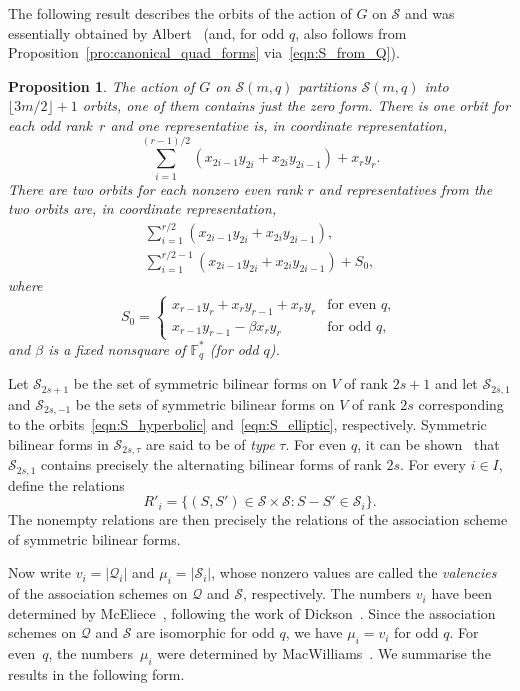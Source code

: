 \documentclass[10pt]{article}
\newtheorem{prop}[theorem]{Proposition}
\theoremstyle{definition}
\newcommand{\FF}{\mathbb{F}}
\newcommand{\Q}{\mathscr{Q}}
\renewcommand{\S}{\mathscr{S}}
\renewcommand{\t}{\tau}
\newcommand{\abs}[1]{\lvert#1\rvert}
\newcommand{\floor}[1]{\lfloor#1\rfloor}
\begin{document}
\par
The following result describes the orbits of the action of $G$ on $\S$ and was essentially obtained by Albert~\cite{Alb1938} (and, for odd $q$, also follows from Proposition~\ref{pro:canonical_quad_forms} via~\eqref{eqn:S_from_Q}).
\begin{prop}
\label{pro:canonical_sym_bil_forms}
The action of $G$ on $\S(m,q)$ partitions $\S(m,q)$ into $\floor{3m/2}+1$ orbits, one of them contains just the zero form. There is one orbit for each odd rank~$r$ and one representative is, in coordinate representation, 
\[
\sum_{i=1}^{(r-1)/2}(x_{2i-1}y_{2i}+x_{2i}y_{2i-1})+x_ry_r.
\]
There are two orbits for each nonzero even rank $r$ and representatives from the two orbits are, in coordinate representation,
\begin{gather}
\sum_{i=1}^{r/2}(x_{2i-1}y_{2i}+x_{2i}y_{2i-1}),   \label{eqn:S_hyperbolic}\\
\sum_{i=1}^{r/2-1}(x_{2i-1}y_{2i}+x_{2i}y_{2i-1})+S_0,   \label{eqn:S_elliptic}
\end{gather}
where 
\[
S_0=\begin{cases}
x_{r-1}y_r+x_ry_{r-1}+x_ry_r & \text{for even $q$},\\
x_{r-1}y_{r-1}-\beta x_ry_r       & \text{for odd $q$},
\end{cases}
\]
and $\beta$ is a fixed nonsquare of $\FF_q^*$ (for odd $q$).
\end{prop}
\par
Let $\S_{2s+1}$ be the set of symmetric bilinear forms on $V$ of rank $2s+1$ and let $\S_{2s,1}$ and $\S_{2s,-1}$ be the sets of symmetric bilinear forms on $V$ of rank $2s$ corresponding to the orbits~\eqref{eqn:S_hyperbolic} and~\eqref{eqn:S_elliptic}, respectively. Symmetric bilinear forms in $\S_{2s,\t}$ are said to be of \emph{type} $\t$. For even $q$, it can be shown~\cite{Alb1938} that $\S_{2s,1}$ contains precisely the alternating bilinear forms of rank $2s$. For every $i\in I$, define the relations 
\begin{equation}
R'_i=\{(S,S')\in\S\times \S:S-S'\in \S_i\}.   \label{eqn:relations_S}
\end{equation}
The nonempty relations are then precisely the relations of the association scheme of symmetric bilinear forms. 
\par
Now write $v_i=\abs{\Q_i}$ and $\mu_i=\abs{\S_i}$, whose nonzero values are called the \emph{valencies} of the association schemes on $\Q$ and $\S$, respectively. The numbers $v_i$ have been determined by McEliece~\cite{McE1969}, following the work of Dickson~\cite{Dic1958}. Since the association schemes on $\Q$ and $\S$ are isomorphic for odd $q$, we have $\mu_i=v_i$ for odd $q$. For even~$q$, the numbers~$\mu_i$ were determined by MacWilliams~\cite{Mac1969}. We summarise the results in the following form.
\end{document}

